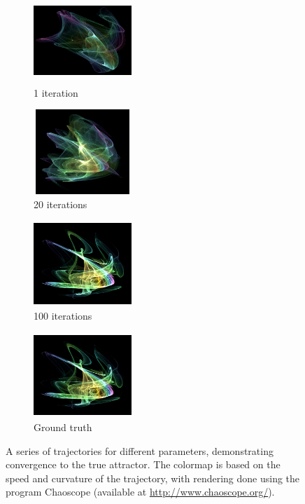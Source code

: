 \begin{figure}[t]
	\centering
	\begin{subfigure}[t]{0.24\textwidth}
		\centering
		\includegraphics[height=3.2cm,width=3.7cm]{chaos/compressed/first_iter_alt.png}
		\caption{1 iteration}
	\end{subfigure}
	\begin{subfigure}[t]{0.24\textwidth}
		\centering
		\tiny
		\includegraphics[height=3.2cm,width=3.7cm]{chaos/compressed/20_iter_alt.png}
		\caption{20 iterations}
	\end{subfigure}
	\begin{subfigure}[t]{0.24\textwidth}
		\centering
		\tiny
		\includegraphics[height=3.2cm,width=3.7cm]{chaos/compressed/100_iter_altj.png}
		\caption{100 iterations}
	\end{subfigure}
	\begin{subfigure}[t]{0.24\textwidth}
		\centering
		\tiny
		\includegraphics[height=3.2cm,width=3.7cm]{chaos/compressed/target_light.png}
		\caption{Ground truth}
	\end{subfigure}
	\vspace{5pt}
	\caption{A series of trajectories for different parameters, demonstrating convergence to the true attractor.  The colormap is based on the speed and curvature of the trajectory, with rendering done using the program Chaoscope (available at {\href{http://www.chaoscope.org/}{http://www.chaoscope.org/}}). \label{fig:chaoscope}}
	\vspace{5pt}
\end{figure}


